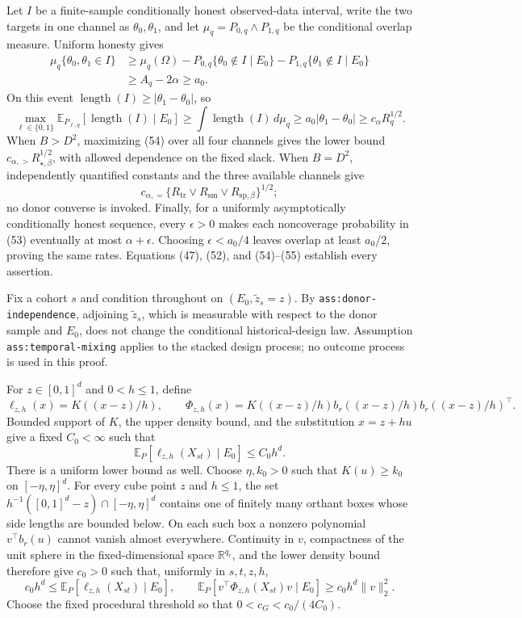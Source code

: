 Let \(I\) be a finite-sample conditionally honest observed-data interval, write the two targets in one channel as \(\theta_0,\theta_1\), and let \(\mu_q=P_{0,q}\wedge P_{1,q}\) be the conditional overlap measure.  Uniform honesty gives
\[
\begin{aligned}
\mu_q\{\theta_0,\theta_1\in I\}
&\geq\mu_q(\Omega)
-P_{0,q}\{\theta_0\notin I\mid E_0\}
-P_{1,q}\{\theta_1\notin I\mid E_0\}\\
&\geq A_q-2\alpha\geq a_0.
\end{aligned}
\tag{53}
\]
On this event \(\operatorname{length}(I)\geq|\theta_1-\theta_0|\), so
\[
\max_{\ell\in\{0,1\}}
\mathbb E_{P_{\ell,q}}[\operatorname{length}(I)\mid E_0]
\geq\int\operatorname{length}(I)\,d\mu_q
\geq a_0|\theta_1-\theta_0|
\geq c_\alpha R_q^{1/2}.
\tag{54}
\]
When \(B>D^2\), maximizing (54) over all four channels gives the lower bound
\(c_{\alpha,>}R_{\star,\beta}^{1/2}\), with allowed dependence on the fixed slack.  When \(B=D^2\), independently quantified constants and the three available channels give
\[
c_{\alpha,=}
\{R_{\mathrm{tr}}\vee R_{\mathrm{sm}}\vee R_{\mathrm{sp},\beta}\}^{1/2};
\tag{55}
\]
no donor converse is invoked.  Finally, for a uniformly asymptotically conditionally honest sequence, every \(\epsilon>0\) makes each noncoverage probability in (53) eventually at most \(\alpha+\epsilon\).  Choosing \(\epsilon<a_0/4\) leaves overlap at least \(a_0/2\), proving the same rates.  Equations (47), (52), and (54)--(55) establish every assertion.

Fix a cohort \(s\) and condition throughout on \((E_0,\widetilde z_s=z)\).  By \texttt{ass:donor-independence}, adjoining \(\widetilde z_s\), which is measurable with respect to the donor sample and \(E_0\), does not change the conditional historical-design law.  Assumption \texttt{ass:temporal-mixing} applies to the stacked design process; no outcome process is used in this proof.

For \(z\in[0,1]^d\) and \(0<h\leq1\), define
\[
\ell_{z,h}(x)=K((x-z)/h),
\qquad
\Phi_{z,h}(x)=K((x-z)/h)b_r((x-z)/h)b_r((x-z)/h)^\top.
\]
Bounded support of \(K\), the upper density bound, and the substitution \(x=z+hu\) give a fixed \(C_0<\infty\) such that
\[
\mathbb E_P[\ell_{z,h}(X_{st})\mid E_0]\leq C_0h^d.
\tag{56}
\]
There is a uniform lower bound as well.  Choose \(\eta,k_0>0\) such that \(K(u)\geq k_0\) on \([-\eta,\eta]^d\).  For every cube point \(z\) and \(h\leq1\), the set
\(h^{-1}([0,1]^d-z)\cap[-\eta,\eta]^d\) contains one of finitely many orthant boxes whose side lengths are bounded below.  On each such box a nonzero polynomial \(v^\top b_r(u)\) cannot vanish almost everywhere.  Continuity in \(v\), compactness of the unit sphere in the fixed-dimensional space \(\mathbb R^{q_r}\), and the lower density bound therefore give \(c_0>0\) such that, uniformly in \(s,t,z,h\),
\[
c_0h^d\leq\mathbb E_P[\ell_{z,h}(X_{st})\mid E_0],
\qquad
\mathbb E_P[v^\top\Phi_{z,h}(X_{st})v\mid E_0]
\geq c_0h^d\|v\|_2^2.
\tag{57}
\]
Choose the fixed procedural threshold so that \(0<c_G<c_0/(4C_0)\).

